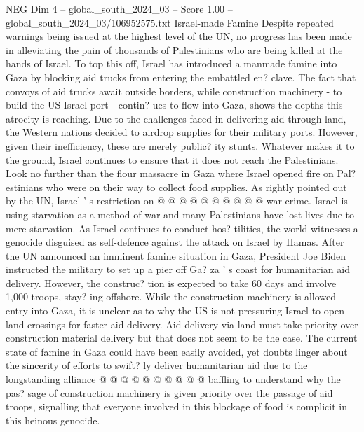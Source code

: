 \begin{textsample}{NEG Dim 4 – global\_south\_2024\_03 – Score 1.00 – global\_south\_2024\_03/106952575.txt}  \label{ex:f4_neg_357}
Israel-made Famine Despite repeated warnings being issued at the highest level of the UN, no progress has been made in alleviating the pain of thousands of Palestinians who are being killed at the hands of Israel.
To top this off, Israel has introduced a manmade famine into Gaza by blocking aid trucks from entering the embattled en? clave.
The fact that convoys of aid trucks await outside borders, while construction machinery - to build the US-Israel port - contin? ues to flow into Gaza, shows the depths this atrocity is reaching.
Due to the challenges faced in delivering aid through land, the Western nations decided to airdrop supplies for their military ports.
However, given their inefficiency, these are merely public? ity stunts.
Whatever makes it to the ground, Israel continues to ensure that it does not reach the Palestinians.
Look no further than the flour massacre in Gaza where Israel opened fire on Pal? estinians who were on their way to collect food supplies.
As rightly pointed out by the UN, Israel ' s restriction on @ @ @ @ @ @ @ @ @ @ war crime.
Israel is using starvation as a method of war and many Palestinians have lost lives due to mere starvation.
As Israel continues to conduct hos? tilities, the world witnesses a genocide disguised as self-defence against the attack on Israel by Hamas.
After the UN announced an imminent famine situation in Gaza, President Joe Biden instructed the military to set up a pier off Ga? za ' s coast for humanitarian aid delivery.
However, the construc? tion is expected to take 60 days and involve 1,000 troops, stay? ing offshore.
While the construction machinery is allowed entry into Gaza, it is unclear as to why the US is not pressuring Israel to open land crossings for faster aid delivery.
Aid delivery via land must take priority over construction material delivery but that does not seem to be the case.
The current state of famine in Gaza could have been easily avoided, yet doubts linger about the sincerity of efforts to swift? ly deliver humanitarian aid due to the longstanding alliance @ @ @ @ @ @ @ @ @ @ baffling to understand why the pas? sage of construction machinery is given priority over the passage of aid troops, signalling that everyone involved in this blockage of food is complicit in this heinous genocide.

\end{textsample}
